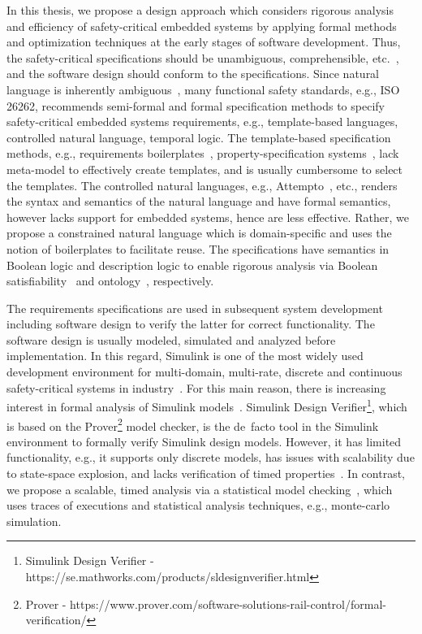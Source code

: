 In this thesis, we propose a design approach which considers rigorous analysis and efficiency of safety-critical embedded systems by applying formal methods and optimization techniques at the early stages of software development. Thus, the safety-critical  specifications should be unambiguous, comprehensible, etc.~\cite{ieereqspecstandard}, and the software design should conform to the specifications. Since natural language is inherently ambiguous~\cite{ieereqspecstandard}, many functional safety standards, e.g., ISO 26262, recommends semi-formal and formal specification methods to specify safety-critical embedded systems requirements, e.g., template-based languages, controlled natural language, temporal logic. The template-based specification methods, e.g., requirements boilerplates~\cite{Hull2011RequirementsEngineering}, property-specification systems~\cite{Dwyer1999PatternsVerification}, lack meta-model to effectively create templates, and is usually cumbersome to select the templates. The controlled natural languages, e.g., Attempto~\cite{attempto96}\cite{Fuchs2008AttemptoRepresentation}, etc., renders the syntax and semantics of the natural language and have formal semantics, however lacks support for embedded systems, hence are less effective. Rather, we propose a constrained natural language which is domain-specific and uses the notion of boilerplates to facilitate reuse. The specifications have semantics in Boolean logic and description logic to enable rigorous analysis via Boolean satisfiability~\cite{Malik2009BooleanSuccess} and ontology~\cite{f25ea3c6f4b743cd90c150926bbcf3db}, respectively.

The requirements specifications are used in subsequent system development including software design to verify the latter for correct functionality. The software design is usually modeled, simulated and analyzed before implementation. In this regard, Simulink is one of the most widely used development environment for multi-domain, multi-rate, discrete and continuous safety-critical systems in industry~\cite{JamesB.Dabney2003MasteringSimulink}. For this main reason, there is increasing interest in formal analysis of Simulink models~\cite{Manamcheri2011AModels}. Simulink Design Verifier\footnote{Simulink Design Verifier - https://se.mathworks.com/products/sldesignverifier.html}, which is based on the Prover\footnote{Prover - https://www.prover.com/software-solutions-rail-control/formal-verification/} model checker, is the de~facto tool in the Simulink environment to formally verify Simulink design models. However, it has limited functionality, e.g., it supports only discrete models, has issues with scalability due to state-space explosion, and lacks verification of timed properties~\cite{Leitner2008SimulinkStudy}.  In contrast, we propose a scalable, timed analysis via a statistical model checking~\cite{Legay2010StatisticalOverview}, which uses traces of executions and statistical analysis techniques, e.g., monte-carlo simulation.

